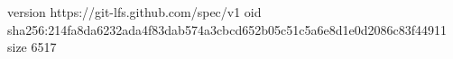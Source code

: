 version https://git-lfs.github.com/spec/v1
oid sha256:214fa8da6232ada4f83dab574a3cbcd652b05c51c5a6e8d1e0d2086c83f44911
size 6517
